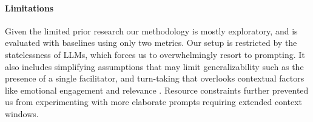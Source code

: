 %
\paragraph{Limitations} 
Given the limited prior research our methodology is mostly exploratory, and is evaluated with  baselines using only two metrics. Our setup is restricted by the statelessness of LLMs, which forces us to overwhelmingly resort to prompting. It also includes simplifying assumptions that may limit generalizability such as the presence of a single facilitator, and turn-taking that overlooks contextual factors like emotional engagement and relevance \cite{robert_2016_comment, Ziegele03102018}. Resource constraints further prevented us from experimenting with more elaborate prompts requiring extended context windows.

